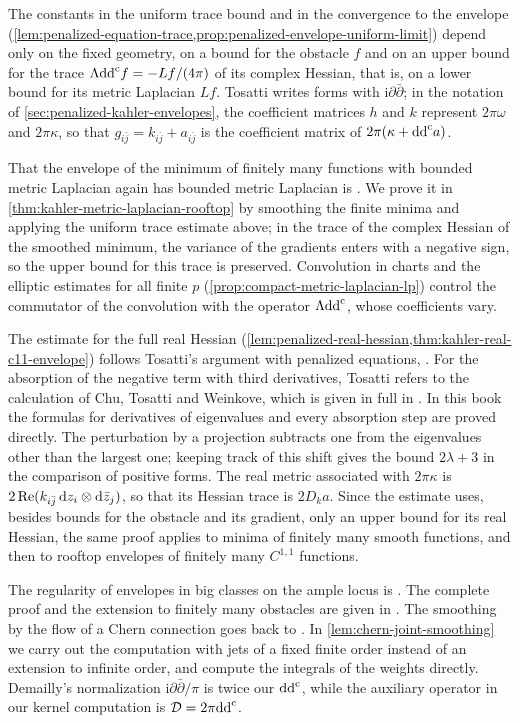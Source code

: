 The constants in the uniform trace bound and in the convergence to the envelope (\cref{lem:penalized-equation-trace,prop:penalized-envelope-uniform-limit}) depend only on the fixed geometry, on a bound for the obstacle $f$ and on an upper bound for the trace $\Lambda\mathrm{dd}^{\mathrm{c}} f=-Lf/(4\pi)$ of its complex Hessian, that is, on a lower bound for its metric Laplacian $Lf$. Tosatti writes forms with $\mathrm i\partial\bar\partial$; in the notation of \cref{sec:penalized-kahler-envelopes}, the coefficient matrices $h$ and $k$ represent $2\pi\omega$ and $2\pi\kappa$, so that $g_{i\bar j}=k_{i\bar j}+a_{i\bar j}$ is the coefficient matrix of $2\pi(\kappa+\mathrm{dd}^{\mathrm{c}} a)$.

That the envelope of the minimum of finitely many functions with bounded metric Laplacian again has bounded metric Laplacian is \cite[Theorem 2.5(ii)]{DarvasRubinstein2014v1}. We prove it in \cref{thm:kahler-metric-laplacian-rooftop} by smoothing the finite minima and applying the uniform trace estimate above; in the trace of the complex Hessian of the smoothed minimum, the variance of the gradients enters with a negative sign, so the upper bound for this trace is preserved. Convolution in charts and the elliptic estimates for all finite $p$ (\cref{prop:compact-metric-laplacian-lp}) control the commutator of the convolution with the operator $\Lambda\mathrm{dd}^{\mathrm{c}}$, whose coefficients vary.

The estimate for the full real Hessian (\cref{lem:penalized-real-hessian,thm:kahler-real-c11-envelope}) follows Tosatti's argument with penalized equations, \cite[Section~2, proof of Theorem~1.1]{Tos18}. For the absorption of the negative term with third derivatives, Tosatti refers to the calculation of Chu, Tosatti and Weinkove, which is given in full in \cite[Section 2, Lemmas 2.1--2.2]{CTW17}. In this book the formulas for derivatives of eigenvalues and every absorption step are proved directly. The perturbation by a projection subtracts one from the eigenvalues other than the largest one; keeping track of this shift gives the bound $2\lambda+3$ in the comparison of positive forms. The real metric associated with $2\pi\kappa$ is $2\operatorname{Re}(k_{i\bar j}\,\mathrm dz_i\otimes\mathrm d\bar z_j)$, so that its Hessian trace is $2D_ka$. Since the estimate uses, besides bounds for the obstacle and its gradient, only an upper bound for its real Hessian, the same proof applies to minima of finitely many smooth functions, and then to rooftop envelopes of finitely many $C^{1,1}$ functions.

The regularity of envelopes in big classes on the ample locus is \cite[Theorem 1.1]{DNT23}. The complete proof and the extension to finitely many obstacles are given in \cite[Lemmas 3.1, 3.3--3.5, Section 4 and Theorem 4.2]{DNT23}. The smoothing by the flow of a Chern connection goes back to \cite[Proposition 2.9, Proposition 3.8, and Theorem 4.1]{DemFlowOnline}. In \cref{lem:chern-joint-smoothing} we carry out the computation with jets of a fixed finite order instead of an extension to infinite order, and compute the integrals of the weights directly. Demailly's normalization $\mathrm i\partial\bar\partial/\pi$ is twice our $\mathrm{dd}^{\mathrm{c}}$, while the auxiliary operator in our kernel computation is $\mathcal D=2\pi\mathrm{dd}^{\mathrm{c}}$.

